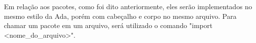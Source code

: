 Em relação aos pacotes, como foi dito anteriormente, eles serão implementados no mesmo estilo da Ada, porém com cabeçalho e corpo no mesmo arquivo. Para chamar um pacote em um arquivo, será utilizado o comando "import <nome_do_arquivo>".